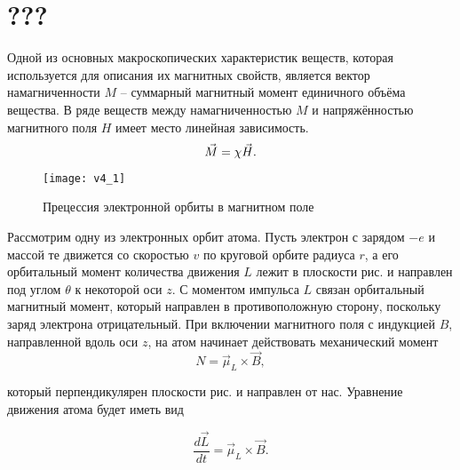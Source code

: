 
\section{???}
Одной из основных макроскопических характеристик веществ, которая используется для описания их магнитных свойств, является вектор намагниченности $M$ -- суммарный магнитный момент единичного объёма вещества. В ряде веществ между намагниченностью $M$ и напряжённостью магнитного поля $H$ имеет место линейная зависимость.
\begin{equation}
	\eqmark[magnetization-magnetic vector]
	\vec{M} = \chi\vec{H}.
\end{equation}

\begin{wrapfigure}[24]{r}{0.35\textwidth}
	\texttt{[image: v4\_1]}
	\caption{Прецессия электронной орбиты в магнитном поле}
\end{wrapfigure}

Рассмотрим одну из электронных орбит атома. Пусть электрон с зарядом $-e$ и массой те движется со скоростью $v$ по круговой орбите радиуса $r$, а его орбитальный момент количества движения $L$ лежит в плоскости рис.  и направлен под углом $\theta$ к некоторой оси $z$. С моментом импульса $L$ связан орбитальный магнитный момент, который направлен в противоположную сторону, поскольку заряд электрона отрицательный. При включении магнитного поля с индукцией $B$, направленной вдоль оси $z$, на атом начинает действовать механический момент
\begin{equation*}
	N = \vec{\mu}_L\times \vec{B},
\end{equation*}

который перпендикулярен плоскости рис.  и направлен от нас. Уравнение движения атома будет иметь вид

\begin{equation*}
	\frac{d\vec{L}}{dt} = \vec{\mu}_L\times \vec{B}.
\end{equation*}

